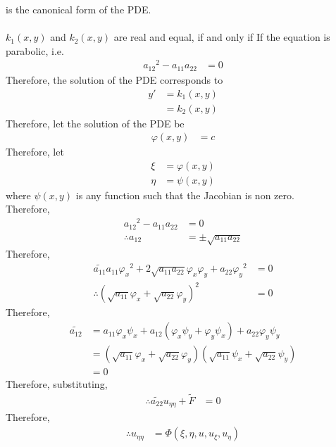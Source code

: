 \documentclass[titlepage, fleqn, a4paper, 12pt, twoside]{article}
\theoremstyle{definition}
\theoremstyle{theorem}
\renewcommand{\tilde}{\widetilde}
\begin{document}
is the canonical form of the PDE.\\
~\\
$k_1(x,y)$ and $k_2(x,y)$ are real and equal, if and only if
If the equation is parabolic, i.e.
\begin{align*}
	{a_{1 2}}^2 - a_{1 1} a_{2 2} & = 0
\end{align*}
Therefore, the solution of the PDE corresponds to
\begin{align*}
	y' & = k_1(x,y) \\
           & = k_2(x,y)
\end{align*}
Therefore, let the solution of the PDE be
\begin{align*}
	\varphi(x,y) & = c
\end{align*}
Therefore, let
\begin{align*}
	\xi  & = \varphi(x,y) \\
	\eta & = \psi(x,y)
\end{align*}
where $\psi(x,y)$ is any function such that the Jacobian is non zero.\\
Therefore,
\begin{align*}
	{a_{1 2}}^2 - a_{1 1} a_{2 2} & = 0 \\
	\therefore a_{1 2}            & = \pm \sqrt{a_{1 1} a_{2 2}}
\end{align*}
Therefore,
\begin{align*}
	\tilde{a_{1 1}} a_{1 1} {\varphi_x}^2 + 2 \sqrt{a_{1 1} a_{2 2}} \varphi_x \varphi_y + a_{2 2} {\varphi_y}^2 & = 0 \\
	\therefore \left( \sqrt{a_{1 1}} \varphi_x + \sqrt{a_{2 2}} \varphi_y \right)^2                              & = 0
\end{align*}
Therefore,
\begin{align*}
	\tilde{a_{1 2}} & = a_{1 1} \varphi_x \psi_x + a_{1 2} \left( \varphi_x \psi_y + \varphi_y \psi_x \right) + a_{2 2} \varphi_y \psi_y                \\
                        & = \left( \sqrt{a_{1 1}} \varphi_x + \sqrt{a_{2 2}} \varphi_y \right) \left( \sqrt{a_{1 1}} \psi_x + \sqrt{a_{2 2}} \psi_y \right) \\
                        & = 0
\end{align*}
Therefore, substituting,
\begin{align*}
	\therefore \tilde{a_{2 2}} u_{\eta \eta} + \tilde{F} & = 0
\end{align*}
Therefore,
\begin{align*}
	\therefore u_{\eta \eta} & = \Phi(\xi,\eta,u,u_{\xi},u_{\eta})
\end{align*}
\end{document}
